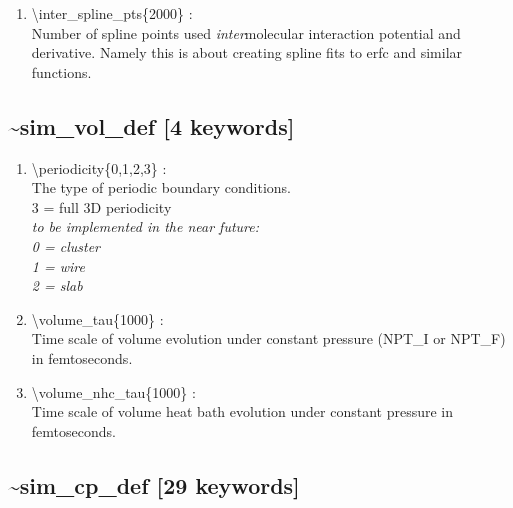 \documentclass[12pt,titlepage]{article}
\begin{document}
\begin{enumerate}
 \vspace{0.15in} 
 \item   \textbackslash inter\_spline\_pts\{2000\} : \\
    Number of spline points used {\it inter}molecular interaction 
    potential and derivative.  Namely this is about creating spline fits to erfc and similar functions.

\end{enumerate}

\newpage
\subsection*{\bf \~{}sim\_vol\_def [4 keywords]}

\begin{enumerate}

\vspace{0.15in} 
 \item  \textbackslash periodicity\{0,1,2,3\} : \\
       The type of periodic boundary conditions.\\
	3 = full 3D periodicity\\
	{\it to be implemented in the near future:\\
       0 = cluster\\
       1 = wire\\
       2 = slab}


 \vspace{0.15in} 
 \item  \textbackslash volume\_tau\{1000\} : \\
     Time scale of volume evolution
     under constant pressure (NPT\_I or NPT\_F) in femtoseconds.
  
 \vspace{0.15in} 
 \item  \textbackslash volume\_nhc\_tau\{1000\} : \\
     Time scale of volume 
     heat bath evolution under constant pressure in femtoseconds.

\end{enumerate}

\newpage
\subsection*{\bf \~{}sim\_cp\_def [29 keywords]}
\end{document}
